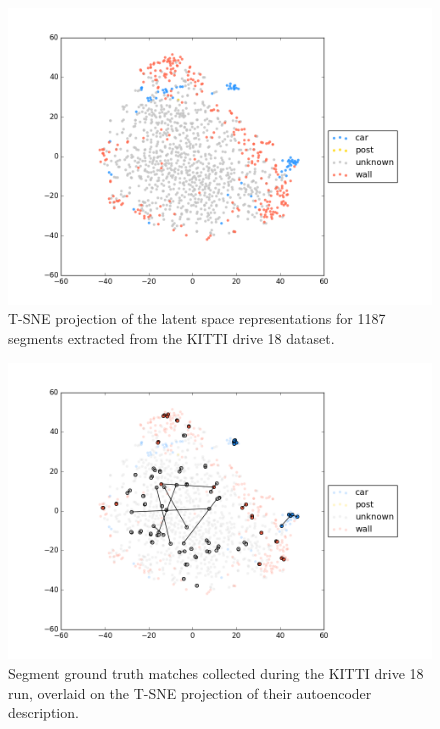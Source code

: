 \begin{figure}
  \centering
  \includegraphics[width=5.2in]{images/t-sne.png}
  \caption{T-SNE projection of the latent space representations for 1187 segments extracted from the KITTI drive 18 dataset.}
  \label{fig:tsne}
\end{figure}

\begin{figure}
  \centering
  \includegraphics[width=5.2in]{images/t-sne_matches.png}
  \caption{Segment ground truth matches collected during the KITTI drive 18 run, overlaid on the T-SNE projection of their autoencoder description.}
  \label{fig:tsne_matches}
\end{figure}

